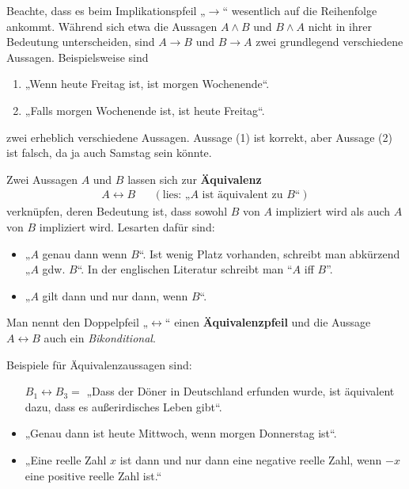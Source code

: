 \begin{bem}
    Beachte, dass es beim Implikationspfeil „$\to$“ wesentlich auf die Reihenfolge ankommt. Während sich etwa die Aussagen $A\land B$ und $B\land A$ nicht in ihrer Bedeutung unterscheiden, sind $A\to B$ und $B\to A$ zwei grundlegend verschiedene Aussagen. Beispielsweise sind
    \begin{enumerate}[(1)]
        \item „Wenn heute Freitag ist, ist morgen Wochenende“.
        \item „Falls morgen Wochenende ist, ist heute Freitag“.
    \end{enumerate}
    zwei erheblich verschiedene Aussagen. Aussage (1) ist korrekt, aber Aussage (2) ist falsch, da ja auch Samstag sein könnte.
\end{bem}


\begin{de}[Äquivalenz] 
    Zwei Aussagen $A$ und $B$ lassen sich zur \textbf{Äquivalenz}
    \begin{align*}
        A\leftrightarrow B  && (\text{lies: „$A$ ist äquivalent zu $B$“})
    \end{align*}
    verknüpfen, deren Bedeutung ist, dass sowohl $B$ von $A$ impliziert wird als auch $A$ von $B$ impliziert wird. Lesarten dafür sind:
    \begin{itemize}
        \item „$A$ genau dann wenn $B$“. Ist wenig Platz vorhanden, schreibt man abkürzend „$A$ gdw. $B$“. In der englischen Literatur schreibt man ``$A$ iff $B$''.
        \item „$A$ gilt dann und nur dann, wenn $B$“.
    \end{itemize}
    Man nennt den Doppelpfeil „$\leftrightarrow$“ einen \textbf{Äquivalenzpfeil} und die Aussage $A\leftrightarrow B$ auch ein \emph{Bikonditional}.
\end{de}

    
\begin{bsp}
    Beispiele für Äquivalenzaussagen sind:
    \begin{itemize}[labelindent=5.5em, labelwidth=, leftmargin=*]
        \item[$B_1\leftrightarrow B_3=$] „Dass der Döner in Deutschland erfunden wurde, ist äquivalent dazu, dass es außerirdisches Leben gibt“.
        \item „Genau dann ist heute Mittwoch, wenn morgen Donnerstag ist“.
        \item „Eine reelle Zahl $x$ ist dann und nur dann eine negative reelle Zahl, wenn $-x$ eine positive reelle Zahl ist.“
    \end{itemize}
\end{bsp}

